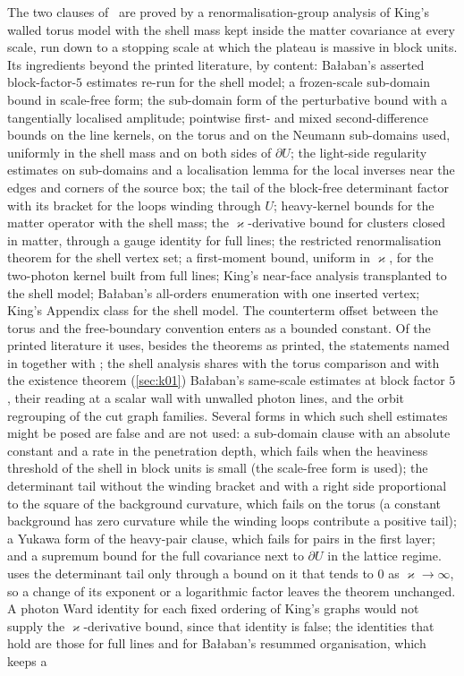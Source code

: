 \begin{remark}\label{rot:rem:behindHS}
The two clauses of \HS\ are proved by a renormalisation-group analysis of King's walled torus model \cite{K1,K2} with the shell mass kept inside the matter covariance at every scale, run down to a stopping scale at which the plateau is massive in block units. Its ingredients beyond the printed literature, by content: Ba{\l}aban's asserted block-factor-$5$ estimates re-run for the shell model; a frozen-scale sub-domain bound in scale-free form; the sub-domain form of the perturbative bound with a tangentially localised amplitude; pointwise first- and mixed second-difference bounds on the line kernels, on the torus and on the Neumann sub-domains used, uniformly in the shell mass and on both sides of $\partial U$; the light-side regularity estimates on sub-domains and a localisation lemma for the local inverses near the edges and corners of the source box; the tail of the block-free determinant factor with its bracket for the loops winding through $U$; heavy-kernel bounds for the matter operator with the shell mass; the $\varkappa$-derivative bound for clusters closed in matter, through a gauge identity for full lines; the restricted renormalisation theorem for the shell vertex set; a first-moment bound, uniform in $\varkappa$, for the two-photon kernel built from full lines; King's near-face analysis \cite[\S5.2]{K2} transplanted to the shell model; Ba{\l}aban's all-orders enumeration \cite[\S\S2--3]{Ba3} with one inserted vertex; King's Appendix class \cite[(A.1)--(A.8)]{K1} for the shell model. The counterterm offset between the torus and the free-boundary convention enters as a bounded constant. Of the printed literature it uses, besides the theorems as printed, the statements named in  together with \cite[Lemma~2.7, (2.113)]{Ba2}; the shell analysis shares with the torus comparison and with the existence theorem (\cref{sec:k01}) Ba{\l}aban's same-scale estimates at block factor $5$, their reading at a scalar wall with unwalled photon lines, and the orbit regrouping of the cut graph families. Several forms in which such shell estimates might be posed are false and are not used: a sub-domain clause with an absolute constant and a rate in the penetration depth, which fails when the heaviness threshold of the shell in block units is small (the scale-free form is used); the determinant tail without the winding bracket and with a right side proportional to the square of the background curvature, which fails on the torus (a constant background has zero curvature while the winding loops contribute a positive tail); a Yukawa form of the heavy-pair clause, which fails for pairs in the first layer; and a supremum bound for the full covariance next to $\partial U$ in the lattice regime.  uses the determinant tail only through a bound on it that tends to $0$ as $\varkappa\to\infty$, so a change of its exponent or a logarithmic factor leaves the theorem unchanged. A photon Ward identity for each fixed ordering of King's graphs would not supply the $\varkappa$-derivative bound, since that identity is false; the identities that hold are those for full lines and for Ba{\l}aban's resummed organisation, which keeps a 
\end{remark}
